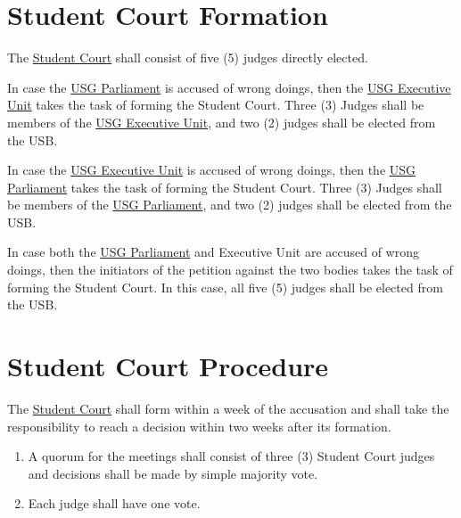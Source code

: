 \label{art:judicative}
\section{Student Court Formation}
The \hyperref[StudentCourtDef]{Student Court} shall consist of five (5) judges directly elected.
\begin{parenum}
	\item In case the \hyperref[USGParliamentDef]{USG Parliament} is accused of wrong doings, then the \hyperref[USGexecutiveUnitDef]{USG Executive Unit} takes the task of forming the Student Court. Three (3) Judges shall be members of the \hyperref[USGexecutiveUnitDef]{USG Executive Unit}, and two (2) judges shall be elected from the USB.
	\item In case the \hyperref[USGexecutiveUnitDef]{USG Executive Unit} is accused of wrong doings, then the \hyperref[USGParliamentDef]{USG Parliament} takes the task of forming the Student Court. Three (3) Judges shall be members of the \hyperref[USGParliamentDef]{USG Parliament}, and two (2) judges shall be elected from the USB.
	\item In case both the \hyperref[USGParliamentDef]{USG Parliament} and Executive Unit are accused of wrong doings, then the initiators of the petition against the two bodies takes the task of forming the Student Court. In this case, all five (5) judges shall be elected from the USB.
\end{parenum}

\section{Student Court Procedure}
The \hyperref[StudentCourtDef]{Student Court} shall form within a week of the accusation and shall take the responsibility to reach a decision within two weeks after its formation. 
\begin{enumerate}[label={\textbf{\S\arabic*}}]
	\item A quorum for the meetings shall consist of three (3) Student Court judges and decisions shall be made by simple majority vote.
	\item Each judge shall have one vote.
\end{enumerate}